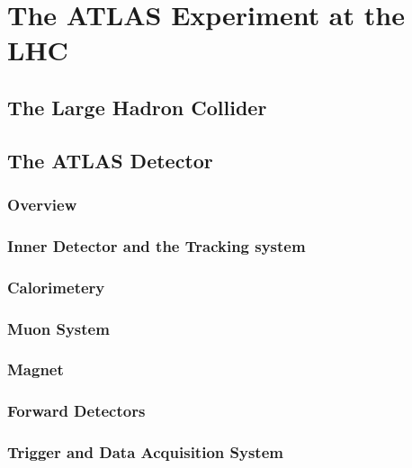 \section{The ATLAS Experiment at the LHC}
	\subsection{The Large Hadron Collider} 
	\subsection{The ATLAS Detector}
		\subsubsection{Overview}
		\subsubsection{Inner Detector and the Tracking system}
		\subsubsection{Calorimetery}
		\subsubsection{Muon System}
		\subsubsection{Magnet}
		\subsubsection{Forward Detectors}
		\subsubsection{Trigger and Data Acquisition System}
%